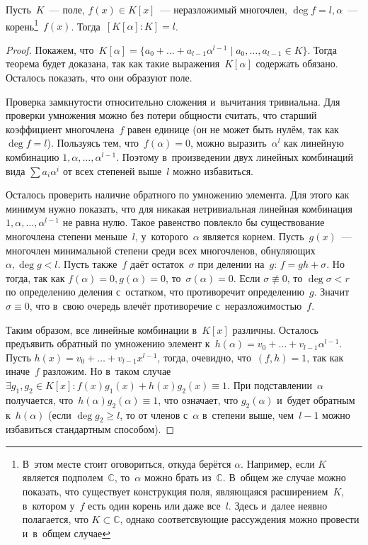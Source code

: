 \documentclass{article}
\begin{document}
\begin{theorem}
  Пусть~$K$~--- поле, $f(x) \in K[x]$~--- неразложимый многочлен, $\deg f = l,
  \alpha$~--- корень\footnote{В~этом месте стоит оговориться, откуда берётся
  $\alpha$. Например, если $K$ является подполем~$\mathbb{C}$, то~$\alpha$ можно
  брать из~$\mathbb{C}$. В~общем же случае можно показать, что существует
  конструкция поля, являющаяся расширением~$K$, в~котором у~$f$ есть один корень
  или даже все~$l$. Здесь и~далее неявно полагается, что $K \subset \mathbb{C}$,
  однако соответсвующие рассуждения можно провести и~в~общем случае}~$f(x)$.
  Тогда~$[K[\alpha]:K] = l$.
\end{theorem}
\begin{proof}
  Покажем, что~$K[\alpha] = \{a_0 + \ldots + a_{l-1}\alpha^{l-1}
  \mid a_0, \ldots, a_{l-1} \in K\}$. Тогда теорема будет доказана, так как
  такие выражения~$K[\alpha]$ содержать обязано. Осталось показать, что они
  образуют поле.

  Проверка замкнутости относительно сложения и~вычитания тривиальна. Для
  проверки умножения можно без потери общности считать, что старший коэффициент
  многочлена~$f$ равен единице (он не может быть нулём, так как $\deg f = l$).
  Пользуясь тем, что~$f(\alpha) = 0$, можно выразить~$\alpha^l$ как линейную
  комбинацию $1, \alpha, \ldots, \alpha^{l-1}$. Поэтому в~произведении двух
  линейных комбинаций вида $\sum a_i \alpha^i$ от всех степеней выше~$l$ можно
  избавиться.

  Осталось проверить наличие обратного по умножению элемента. Для этого как
  минимум нужно показать, что для никакая нетривиальная линейная комбинация~$1,
  \alpha, \ldots, \alpha^{l-1}$ не равна нулю. Такое равенство повлекло бы
  существование многочлена степени меньше~$l$, у~которого~$\alpha$ является
  корнем. Пусть~$g(x)$~--- многочлен минимальной степени среди всех многочленов,
  обнуляющих~$\alpha, \deg g < l$. Пусть также~$f$ даёт остаток~$\sigma$ при
  делении на~$g$: $f = gh + \sigma$. Но тогда, так как $f(\alpha) = 0, g(\alpha)
  = 0$, то~$\sigma(\alpha)  = 0$. Если $\sigma \not\equiv 0$, то $\deg
  \sigma < r$ по определению деления с~остатком, что противоречит
  определению~$g$. Значит~$\sigma \equiv 0$, что в~свою очередь влечёт
  противоречие с~неразложимостью~$f$.

  Таким образом, все линейные комбинации в~$K[x]$ различны. Осталось предъявить
  обратный по умножению элемент к~$h(\alpha) = v_0 + \ldots +
  v_{l-1}\alpha^{l-1}$. Пусть $h(x) = v_0 + \ldots + v_{l-1}x^{l-1}$, тогда,
  очевидно, что~$(f, h) = 1$, так как иначе~$f$ разложим. Но в~таком
  случае~$\exists g_1, g_2 \in K[x]: f(x)g_1(x) + h(x)g_2(x) \equiv 1$. При
  подставлении~$\alpha$ получается, что~$h(\alpha)g_2(\alpha) \equiv 1$, что
  означает, что $g_2(\alpha)$ и~будет обратным к~$h(\alpha)$ (если $\deg g_2 \ge
  l$, то от членов с~$\alpha$ в~степени выше, чем~$l-1$ можно избавиться
  стандартным способом).
\end{proof}
\end{document}
